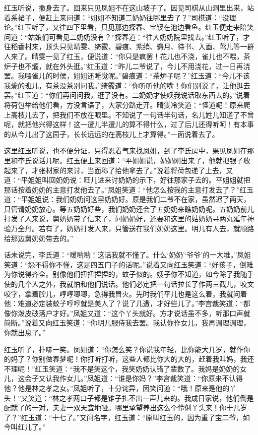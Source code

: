 \documentclass[12pt,oneside]{book}
\begin{document}
红玉听说，撤身去了。回来只见凤姐不在这山坡子了。因见司棋从山洞里出来，站着系裙子，便赶上来问道：“姐姐不知道二奶奶往哪里去了？”司棋道：“没理论。”红玉听了，又往四下里看，只见那边探春、宝钗在池边看鱼。红玉便走来陪笑问道：“姑娘们可看见二奶奶没有？”探春道：“往大奶奶院里找去。”红玉听了，才往稻香村来，顶头只见晴雯、绮霰、碧痕、紫绡、麝月、待书、入画、莺儿等一群人来了。晴雯一见了红玉，便说道：“你只是疯罢！花儿也不浇，雀儿也不喂，茶炉子也不爖，就在外头逛。”红玉道：“昨儿二爷说了，今儿不用浇花，过一日再浇罢。我喂雀儿的时侯，姐姐还睡觉呢。”碧痕道：“茶炉子呢？”红玉道：“今儿不该我爖的班儿，有茶没茶别问我。”绮霰道：“你听听他的嘴！你们别说了，让他逛去罢。”红玉道：“你们再问问我，逛了没有。二奶奶才使唤我说话取东西去的。”说着将荷包举给他们看，方没言语了，大家分路走开。晴雯冷笑道：“怪道呢！原来爬上高枝儿去了，把我们不放在眼里。不知说了一句话半句话，名儿姓儿知道了不曾呢，就把他兴得这样！这一遭儿半遭儿的算不得什么，过了后儿还得听呵！有本事的从今儿出了这园子，长长远远的在高枝儿上才算得。”一面说着去了。

这里红玉听说，也不便分证，只得忍着气来找凤姐，到了李氏房中，果见凤姐在那里和李氏说话儿呢。红玉便上来回道：“平姐姐说，奶奶刚出来了，他就把银子收起来了，才张材家的来讨，当面称了给他拿去了。”说着将荷包递了上去，又道：“平姐姐叫回奶奶说：旺儿进来讨奶奶的示下，好往那家子去的。平姐姐就把那话按着奶奶的主意打发他去了。”凤姐笑道：“他怎么按我的主意打发去了？”红玉道：“平姐姐说：我们奶奶问这里奶奶好。原是我们二爷不在家，虽然迟了两天，只管请奶奶放心。等五奶奶好些，我们奶奶还会了五奶奶来瞧奶奶呢。五奶奶前儿打发了人来说，舅奶奶带了信来了，问奶奶好，还要和这里的姑奶奶寻两丸延年神验万全丹。若有了，奶奶打发人来，只管送在我们奶奶这里。明儿有人去，就顺路给那边舅奶奶带去的。”

话未说完，李氏道：“嗳哟哟！这话我就不懂了。什么‘奶奶’‘爷爷’的一大堆。”凤姐笑道：“怨不得你不懂，这是四五门子的话呢。”说着又向红玉笑道：“好孩子，倒难为你说得齐全。别像他们扭扭捏捏的，蚊子似的。嫂子你不知道，如今除了我随手使的几个人之外，我就怕和他们说话。他们必定把一句话拉长了作两三截儿，咬文咬字，拿着腔儿，哼哼唧唧，急得我冒火。先时我们平儿也是这么着，我就问着他：难道必定装蚊子哼哼就是美人了？说了几遭，才好些儿了。”李宫裁笑道：“都像你泼皮破落户才好。”凤姐又道：“这个丫头就好。方才说话虽不多，听那口声就简断。”说着又向红玉笑道：“你明儿服侍我去罢。我认你作女儿，我再调理调理，你就出息了。”

红玉听了，扑哧一笑。凤姐道：“你怎么笑？你说我年轻，比你能大几岁，就作你的妈了？你别做春梦呢！你打听打听，这些人都比你大的大的，赶着我叫妈，我还不理呢！”红玉笑道：“我不是笑这个，我笑奶奶认错了辈数了。我妈是奶奶的女儿，这会子又认我作女儿。”凤姐道：“谁是你妈？”李宫裁笑道：“你原来不认得他？他是林之孝之女。”凤姐听了，十分诧异，因笑问道：“哦！原来是他的丫头！”又笑道：“林之孝两口子都是锥子扎不出一声儿来的。我成日家说，他们倒是配就了的一对，夫妻一双天聋地哑。哪里承望养出这么个伶俐丫头来！你十几岁了？”红玉道：“十七了。”又问名字，红玉道：“原叫红玉的，因为重了宝二爷，如今叫红儿了。”
\end{document}
